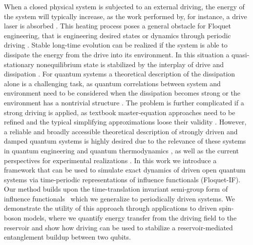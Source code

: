 \documentclass[aps,prb, twocolumn,superscriptaddress]{revtex4-2}
\begin{document}
When a closed physical system is subjected to an external driving, the energy of the system will typically increase, as the work performed by, for instance, a drive laser is absorbed \cite{ikeda2021Fermis}. This heating process poses a general obstacle for Floquet engineering, that is engineering desired states or dynamics through periodic driving \cite{eckardt2017Colloquium, reitter2017Interaction,chen2025Mitigating}. Stable long-time evolution can be realized if the system is able to dissipate the energy from the drive into its environment. In this situation a quasi-stationary nonequilibrium state is stabilized by the interplay of drive and dissipation \cite{Shirai2016May,engelhardt2019Discontinuities,Sato2020Oct, petiziolCavityBasedReservoirEngineering2022a, Mori2023Mar, li2024Coherent, Ritter2025}. For quantum systems a theoretical description of the dissipation alone is a challenging task, as quantum correlations between system and environment need to be considered when the dissipation becomes strong or the environment has a nontrivial structure \cite{deVega2017Jan,Hartmann2020,tello2024Benchmarking}. The problem is further complicated if a strong driving is applied, as textbook master-equation approaches need to be refined and the typical simplifying approximations loose their validity \cite{Mori2023Mar,gulacsi2025Temporally}. However, a reliable and broadly accessible theoretical description of strongly driven and damped quantum systems is highly desired \cite{Kohler1997Jan, Marthaler2006, Ketzmerick2010Aug, Lazarides2020Apr, Gunderson2021Feb, Shen2022Feb, Boness2024, direkci2025Universality} due to the relevance of these systems in quantum engineering and quantum thermodynamics \cite{koyanagi2022Numerically,boettcher2024Dynamics,kolisnyk2024Floquet,Alamo2024Jun}, as well as the current perspectives for experimental realizations \cite{Koski2018Jul,vonHorstig2024Jul,Frattini2024,Ritter2025,ivakhnenko2025Probing}.
In this work we introduce a framework that can be used to simulate exact dynamics of driven open quantum systems via time-periodic representations of influence functionals (Floquet-IF). Our method builds upon the time-translation invariant semi-group form of influence functionals~\cite{Link2024May,sonner2025Semi} which we generalize to periodically driven systems. We demonstrate the utility of this approach through applications to driven spin-boson models, where we quantify energy transfer from the driving field to the reservoir and show how driving can be used to stabilize a reservoir-mediated entanglement buildup between two qubits.
\end{document}
